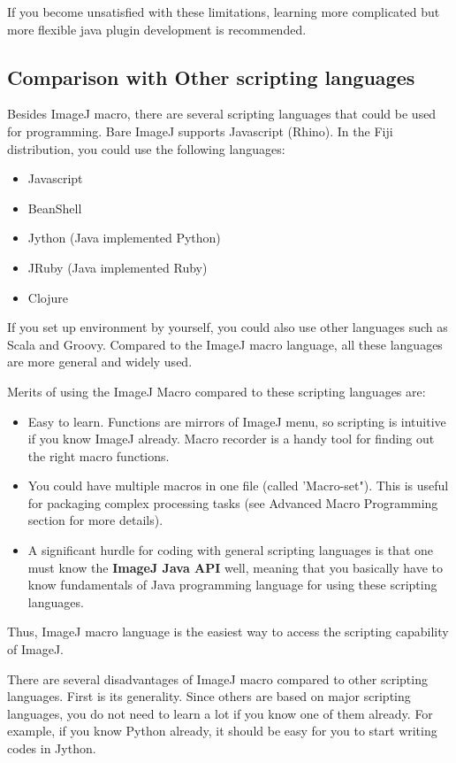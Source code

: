 \documentclass[11pt,a4paper,oneside]{report}
\begin{document}
If you become unsatisfied with these limitations, 
learning more complicated but more flexible java plugin development is recommended. 

\subsection{Comparison with Other scripting languages}
Besides ImageJ macro, there are several scripting languages that
could be used for programming. Bare ImageJ supports Javascript (Rhino).
In the Fiji distribution, you could use the following languages:

\begin{itemize}
 \item Javascript
 \item BeanShell
 \item Jython (Java implemented Python)
 \item JRuby (Java implemented Ruby)
 \item Clojure
 \end{itemize}

If you set up environment by yourself, you could also use other languages such as Scala and Groovy. 
Compared to the ImageJ macro language, all these languages are more general and widely used. 

Merits of using the ImageJ Macro compared to these scripting languages are: 
\begin{itemize}
\item Easy to learn. 
Functions are mirrors of ImageJ menu, so scripting is intuitive if you know ImageJ already. 
Macro recorder is a handy tool for finding out the right macro functions. 

\item You could have multiple macros in one file (called 'Macro-set"). 
This is useful for packaging complex processing tasks (see Advanced Macro Programming section for more details). 

\item A significant hurdle for coding with general scripting languages is that one must know the 
\textbf{ImageJ Java API} well, meaning that you basically have to know 
fundamentals of Java programming language for using these scripting languages. 
\end{itemize}

Thus, ImageJ macro language is the easiest way to access the scripting
capability of ImageJ.

There are several disadvantages of ImageJ macro compared to other
scripting languages. First is its generality. Since others are based on major scripting languages, you do not need to learn a lot if you know one of them already. For example, if you know Python already, 
it should be easy for you to start writing codes in Jython. 
\end{document}
